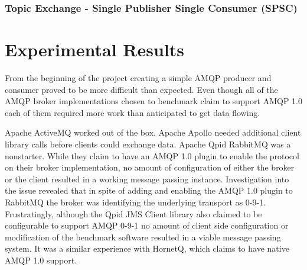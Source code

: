 \documentclass{thesis}
\begin{document}
\subsection{Topic Exchange - Single Publisher Single Consumer (SPSC)}


\chapter{Experimental Results}

From the beginning of the project creating a simple AMQP producer and consumer proved to be more difficult than expected.  Even though all of the AMQP broker implementations chosen to benchmark claim to support AMQP 1.0 each of them required more work than anticipated to get data flowing.  

Apache ActiveMQ worked out of the box.  
Apache Apollo needed additional client library calls before clients could exchange data.
Apache Qpid 
RabbitMQ was a nonstarter.  While they claim to have an AMQP 1.0 plugin to enable the protocol on their broker implementation, no amount of configuration of either the broker or the client resulted in a working message passing instance.  Investigation into the issue revealed that in spite of adding and enabling the AMQP 1.0 plugin to RabbitMQ the broker was identifying the underlying transport as 0-9-1.  Frustratingly, although the Qpid JMS Client library also claimed to be configurable to support AMQP 0-9-1 no amount of client side configuration or modification of the benchmark software resulted in a viable message passing system.
It was a similar experience with HornetQ, which claims to have native AMQP 1.0 support. 

%

\end{document}
